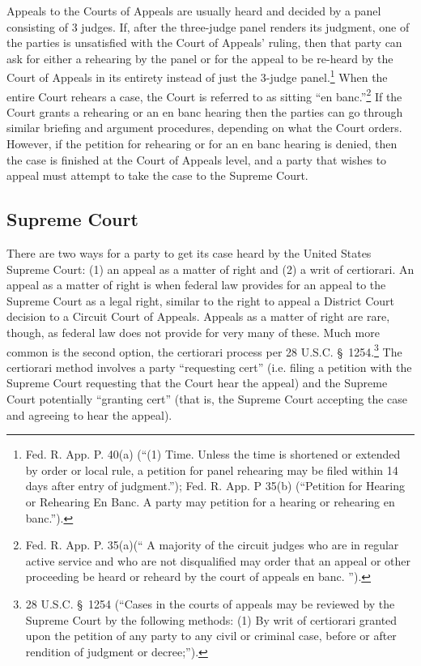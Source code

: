 Appeals to the Courts of Appeals are usually heard and decided by a panel consisting of 3 judges.  If, after the three-judge panel renders its judgment, one of the parties is unsatisfied with the Court of Appeals' ruling, then that party can ask for either a rehearing by the panel or for the appeal to be re-heard by the Court of Appeals in its entirety instead of just the 3-judge panel.\footnote{Fed. R. App. P. 40(a) (``(1) Time. Unless the time is shortened or extended by order or local rule, a petition for panel rehearing may be filed within 14 days after entry of judgment.''); Fed. R. App. P 35(b) (``Petition for Hearing or Rehearing En Banc. A party may petition for a hearing or rehearing en banc.'').}  When the entire Court rehears a case, the Court is referred to as sitting ``en banc.''\footnote{Fed. R. App. P. 35(a)(`` A majority of the circuit judges who are in regular active service and who are not disqualified may order that an appeal or other proceeding be heard or reheard by the court of appeals en banc. '').}  If the Court grants a rehearing or an en banc hearing then the parties can go through similar briefing and argument procedures, depending on what the Court orders.  However, if the petition for rehearing or for an en banc hearing is denied, then the case is finished at the Court of Appeals level, and a party that wishes to appeal must attempt to take the case to the Supreme Court.

\subsection{Supreme Court}

There are two ways for a party to get its case heard by the United States Supreme Court: (1) an appeal as a matter of right and (2) a writ of certiorari.  An appeal as a matter of right is when federal law provides for an appeal to the Supreme Court as a legal right, similar to the right to appeal a District Court decision to a Circuit Court of Appeals.  Appeals as a matter of right are rare, though, as federal law does not provide for very many of these.  Much more common is the second option, the certiorari process per 28 U.S.C. \S\ 1254.\footnote{28 U.S.C. \S\ 1254 (``Cases in the courts of appeals may be reviewed by the Supreme Court by the following methods: (1) By writ of certiorari granted upon the petition of any party to any civil or criminal case, before or after rendition of judgment or decree;'').}  The certiorari method involves a party ``requesting cert'' (i.e. filing a petition with the Supreme Court requesting that the Court hear the appeal) and the Supreme Court potentially ``granting cert'' (that is, the Supreme Court accepting the case and agreeing to hear the appeal).


